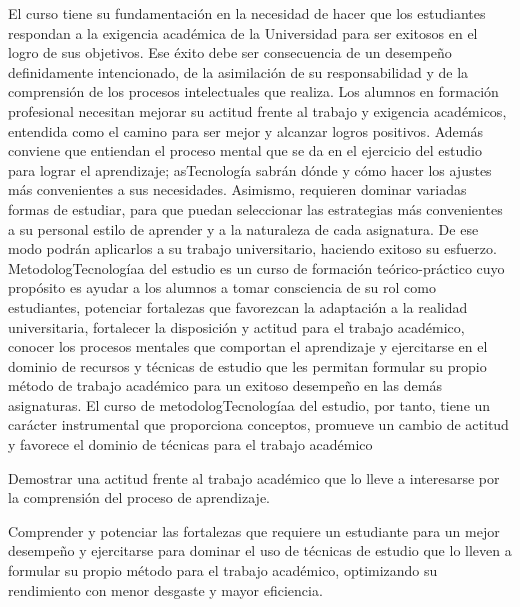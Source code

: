 \begin{syllabus}


\begin{justification}
El curso tiene su fundamentación en la necesidad de hacer que los estudiantes respondan a la exigencia académica de la Universidad para ser exitosos en el logro de sus objetivos. Ese  éxito debe ser consecuencia de un desempeño definidamente intencionado, de la asimilación de su responsabilidad y de la comprensión de los procesos intelectuales que realiza. 
Los alumnos en formación profesional necesitan mejorar su actitud frente al trabajo y exigencia académicos, entendida como el camino para ser mejor y alcanzar logros positivos. Además conviene que entiendan el proceso mental que se da en el ejercicio del estudio para lograr el aprendizaje; asTecnología  sabrán dónde y cómo hacer los ajustes más convenientes a sus necesidades. Asimismo, requieren dominar variadas formas de estudiar, para que puedan seleccionar las estrategias  más convenientes a su personal estilo de aprender y a la naturaleza de cada asignatura. De ese modo podrán  aplicarlos a su trabajo universitario, haciendo exitoso su esfuerzo.
MetodologTecnologíaa del estudio es un curso de formación teórico-práctico cuyo propósito es  ayudar a los alumnos a  tomar consciencia de su rol como estudiantes, potenciar fortalezas que favorezcan la adaptación a la realidad universitaria, fortalecer la disposición y actitud para el trabajo académico, conocer los procesos mentales que comportan el aprendizaje  y ejercitarse en el dominio de recursos y técnicas de estudio que les permitan formular su propio método de trabajo académico para un exitoso desempeño en las demás asignaturas. El curso de metodologTecnologíaa del estudio, por tanto, tiene un carácter instrumental que proporciona conceptos, promueve un cambio de actitud y favorece el dominio de técnicas para el  trabajo académico

\end{justification}

\begin{goals}
\item Demostrar una actitud frente al trabajo académico que lo lleve a interesarse por la comprensión del proceso de aprendizaje.
\item Comprender y potenciar las fortalezas que requiere un estudiante para  un mejor desempeño  y ejercitarse para dominar el uso de  técnicas de estudio que lo lleven a formular su propio método para el trabajo académico, optimizando su rendimiento con menor desgaste y mayor eficiencia.
\end{goals}


\end{syllabus}
